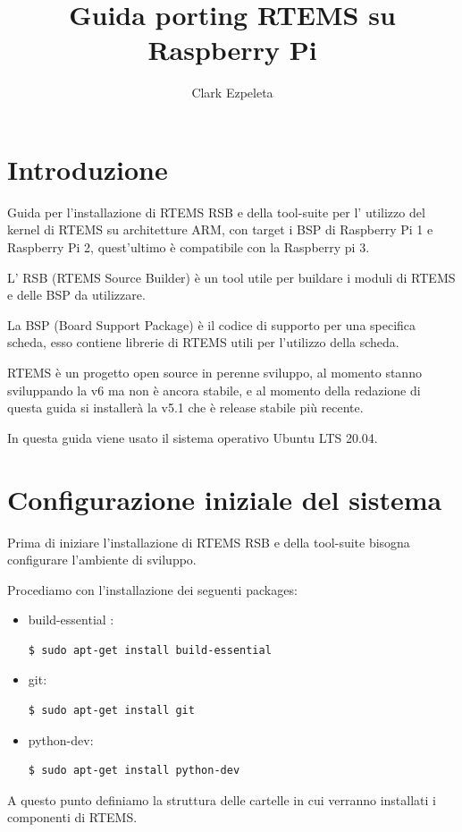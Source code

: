 \documentclass[12pt, a4paper]{article}
\title{Guida porting RTEMS su Raspberry Pi}
\author{Clark Ezpeleta}
\date{}
\begin{document}
\maketitle
\begin{flushleft}
\section{Introduzione}
Guida per l'installazione di RTEMS RSB e della tool-suite per l' utilizzo del kernel di RTEMS su architetture ARM, con target i BSP di Raspberry Pi 1 e Raspberry Pi 2, quest'ultimo è compatibile con la Raspberry pi 3.

L' RSB (RTEMS Source Builder) è un tool utile per buildare i moduli di RTEMS e delle BSP da utilizzare.

La BSP (Board Support Package) è il codice di supporto per una specifica scheda, esso contiene librerie di RTEMS utili per l'utilizzo della scheda.

RTEMS è un progetto open source in perenne sviluppo, al momento stanno sviluppando la v6 ma non è ancora stabile, e al momento della redazione di questa guida si installerà la v5.1 che è release stabile più recente.

In questa guida viene usato il sistema operativo Ubuntu LTS 20.04.
\newpage
\section{Configurazione iniziale del sistema}
Prima di iniziare l'installazione di RTEMS RSB e della tool-suite bisogna configurare l'ambiente di sviluppo.

Procediamo con l'installazione dei seguenti packages:
\begin{itemize}
\item  build-essential : 
\begin{lstlisting}[language=bash] 
$ sudo apt-get install build-essential
\end{lstlisting}
\item git:
\begin{lstlisting}[language=bash] 
$ sudo apt-get install git
\end{lstlisting}
\item python-dev:
\begin{lstlisting}[language=bash] 
 $ sudo apt-get install python-dev
 \end{lstlisting}
\end{itemize}
A questo punto definiamo la struttura delle cartelle in cui verranno installati i componenti di RTEMS.


\end{flushleft}
\end{document}
